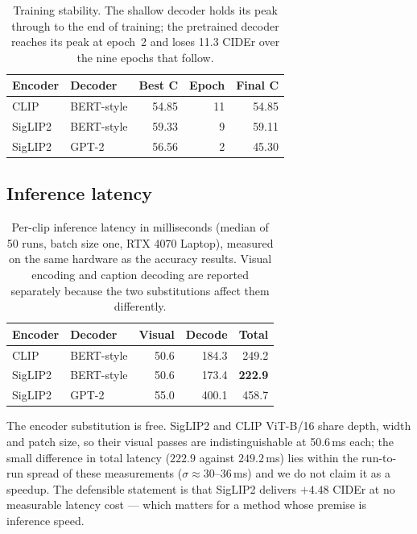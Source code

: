 \documentclass[10pt,twocolumn,letterpaper]{article}
\begin{document}
\begin{table}[t]
\centering\small
\begin{tabular}{llrrr}
\toprule
Encoder & Decoder & Best C & Epoch & Final C \\
\midrule
CLIP    & BERT-style & 54.85 & 11 & 54.85 \\
SigLIP2 & BERT-style & 59.33 & 9 & 59.11 \\
SigLIP2 & GPT-2 & 56.56 & 2 & 45.30 \\
\bottomrule
\end{tabular}
\caption{Training stability. The shallow decoder holds its peak through to the end of training;
the pretrained decoder reaches its peak at epoch~2 and loses 11.3 CIDEr over the nine epochs
that follow.}
\label{tab:stability}
\end{table}

\subsection{Inference latency}

\begin{table}[t]
\centering\small
\begin{tabular}{llrrr}
\toprule
Encoder & Decoder & Visual & Decode & Total \\
\midrule
CLIP    & BERT-style & 50.6 & 184.3 & 249.2 \\
SigLIP2 & BERT-style & 50.6 & 173.4 & \textbf{222.9} \\
SigLIP2 & GPT-2 & 55.0 & 400.1 & 458.7 \\
\bottomrule
\end{tabular}
\caption{Per-clip inference latency in milliseconds (median of 50 runs, batch size one, RTX 4070
Laptop), measured on the same hardware as the accuracy results. Visual encoding and caption
decoding are reported separately because the two substitutions affect them differently.}
\label{tab:latency}
\end{table}

The encoder substitution is free. SigLIP2 and CLIP ViT-B/16 share depth, width and patch size, so
their visual passes are indistinguishable at 50.6\,ms each; the small difference in total latency
($222.9$ against $249.2$\,ms) lies within the run-to-run spread of these measurements
($\sigma \approx 30$--$36$\,ms) and we do not claim it as a speedup. The defensible statement is
that SigLIP2 delivers $+4.48$ CIDEr at no measurable latency cost --- which matters for a method
whose premise is inference speed.
\end{document}
